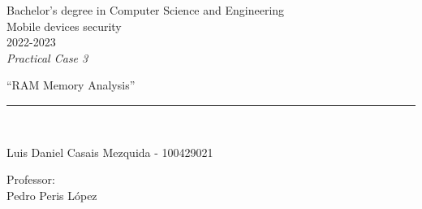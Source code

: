 \def\degree{Bachelor's degree in Computer Science and Engineering}
\def\subject{Mobile devices security}
\def\year{2022-2023}
\def\labType{Practical Case 3}
\def\labName{RAM Memory Analysis}
\def\proffesor{Pedro Peris López}

\begin{titlepage}
	\begin{sffamily}
	\color{azulUC3M}
	\begin{center}

		\begin{figure}[H]
		\end{figure}
		\vspace{1.5cm}

		\begin{Large}
			\degree\\
            \subject\\
			\year\\
			\vspace{2cm}		
			\textsl{\labType}
			\bigskip
			
		\end{Large}

		{\Huge ``\labName''}\\

		\vspace*{0.5cm}
		\rule{10.5cm}{0.1mm}\\
		\vspace*{0.9cm}
		
 		{\LARGE Luis Daniel Casais Mezquida - 100429021}\\
 		\vspace*{0.2cm}
		
		\vspace*{0.8cm}
		
		\begin{Large}
		    Professor:\\
			\proffesor\\
		\end{Large}

	\end{center}
	\vfill
	\end{sffamily}
\end{titlepage}